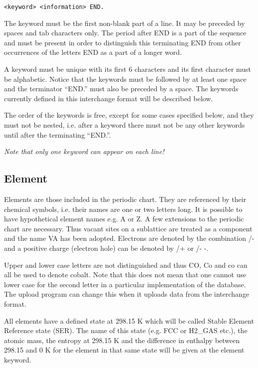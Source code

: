 \documentclass[12pt]{article}
\begin{document}
\begin{verbatim}
<keyword> <information> END.
\end{verbatim}

The keyword must be the first non-blank part of a line. It may be
preceded by spaces and tab characters only. The period after END is a
part of the sequence and must be present in order to distinguish this
terminating END from other occurrences of the letters END as a part of
a longer word.

A keyword must be unique with its first 6 characters and its first
character must be alphabetic. Notice that the keywords must be
followed by at least one space and the terminator ``END.'' must also be
preceded by a space. The keywords currently defined in this interchange
format will be described below.

The order of the keywords is free, except for some cases specified
below, and they must not be nested, i.e. after a keyword there must not
be any other keywords until after the terminating ``END.''.

{\em Note that only one keyword can appear on each line!}

\subsection{Element}

Elements are those included in the periodic chart. They are referenced
by their chemical symbols, i.e. their names are one or two letters
long. It is possible to have hypothetical element names e.g. A or Z. A
few extensions to the periodic chart are necessary. Thus vacant sites
on a sublattice are treated as a component and the name VA has been
adopted. Electrons are denoted by the combination /- and a positive
charge (electron hole) can be denoted by /+ or /- -.

Upper and lower case letters are not distinguished and thus CO, Co and
co can all be used to denote cobalt. Note that this does not mean that
one cannot use lower case for the second letter in a particular
implementation of the database. The upload program can change
this when it uploads data from the interchange format.

All elements have a defined state at 298.15 K which will be called
Stable Element Reference state (SER). The name of this state (e.g. FCC
or H2\_GAS etc.), the atomic mass, the entropy at 298.15 K and the
difference in enthalpy between 298.15 and 0 K for the element in that
same state will be given at the element keyword.
\end{document}
